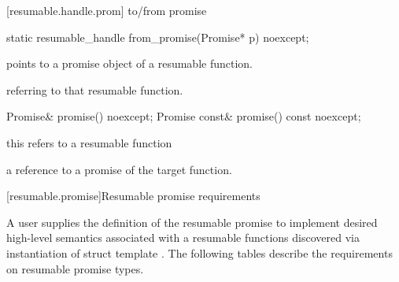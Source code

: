 [resumable.handle.prom]{ to/from promise}
\begin{itemdecl}
  static resumable_handle from_promise(Promise* p) noexcept;	
\end{itemdecl}
\begin{itemdescr}
  \pnum
  \precondition {} points to a promise object of a resumable function.
  
  \pnum
  \returns {} referring to that resumable function.
\end{itemdescr}
\begin{itemdecl}
  Promise& promise() noexcept;		
  Promise const& promise() const noexcept;
\end{itemdecl}

\begin{itemdescr}
  \pnum
  \precondition *this refers to a resumable function
  
  \pnum
  \returns a reference to a promise of the target function.
\end{itemdescr}


[resumable.promise]{Resumable promise requirements}

\pnum
A user supplies the definition of the resumable promise to implement 
desired high-level semantics associated with a resumable functions
discovered via instantiation of struct template .
The following tables describe the requirements on
resumable promise types.


